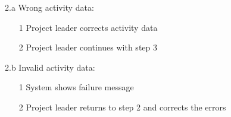 \documentclass[a4paper, 10pt, oneside, draft]{article}
\begin{document}
\begin{usecase}
{	\item[2.a] Wrong activity data:
		\begin{enumerate}
		\item[1] Project leader corrects activity data
		\item[2] Project leader continues with step 3
		\end{enumerate}
	\item[2.b] Invalid activity data:
		\begin{enumerate}
		\item[1] System shows failure message
		\item[2] Project leader returns to step 2 and corrects the errors
		\end{enumerate}
	
}

\end{usecase}
\end{document}
